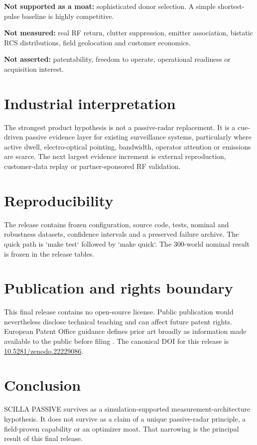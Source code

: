 \documentclass[10pt]{article}
\begin{document}
\textbf{Not supported as a moat:} sophisticated donor selection. A simple shortest-pulse baseline is highly competitive.

\textbf{Not measured:} real RF return, clutter suppression, emitter association, bistatic RCS distributions, field geolocation and customer economics.

\textbf{Not asserted:} patentability, freedom to operate, operational readiness or acquisition interest.

\section{Industrial interpretation}
The strongest product hypothesis is not a passive-radar replacement. It is a cue-driven passive evidence layer for existing surveillance systems, particularly where active dwell, electro-optical pointing, bandwidth, operator attention or emissions are scarce. The next largest evidence increment is external reproduction, customer-data replay or partner-sponsored RF validation.

\section{Reproducibility}
The release contains frozen configuration, source code, tests, nominal and robustness datasets, confidence intervals and a preserved failure archive. The quick path is `make test` followed by `make quick`. The 300-world nominal result is frozen in the release tables.

\section{Publication and rights boundary}
This final release contains no open-source license. Public publication would nevertheless disclose technical teaching and can affect future patent rights. European Patent Office guidance defines prior art broadly as information made available to the public before filing \cite{epo2026}. The canonical DOI for this release is \href{https://doi.org/10.5281/zenodo.22229086}{10.5281/zenodo.22229086}.

\section{Conclusion}
SCILLA PASSIVE survives as a simulation-supported measurement-architecture hypothesis. It does not survive as a claim of a unique passive-radar principle, a field-proven capability or an optimizer moat. That narrowing is the principal result of this final release.
\end{document}
